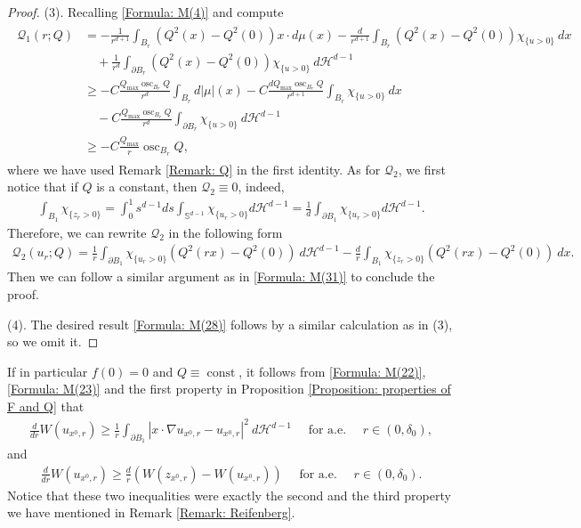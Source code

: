 \documentclass[11pt,reqno]{amsart}
\begin{document}
\begin{proof}
    (3). Recalling \eqref{Formula: M(4)} and compute 
    \begin{align}\label{Formula: M(31)}
    	\begin{alignedat}{5}
    		\mathcal{Q}_{1}(r;Q)&=-\frac{1}{r^{d+1}}\int_{B_{r}}(Q^{2}(x)-Q^{2}(0))x\cdot d\mu(x)-\frac{d}{r^{d+1}}\int_{B_{r}}(Q^{2}(x)-Q^{2}(0))\chi_{\{u>0\}}\:dx\\
    		&\quad+\frac{1}{r^{d}}\int_{\partial B_{r}}(Q^{2}(x)-Q^{2}(0))\chi_{\{u>0\}}\:d\mathcal{H}^{d-1}\\
    		&\geqslant-C\frac{Q_{\mathrm{max}}\operatorname{osc}_{B_{r}}Q}{r^{d}}\int_{B_{r}}d|\mu|(x)-C\frac{dQ_{\mathrm{max}}\operatorname{osc}_{B_{r}}Q}{r^{d+1}}\int_{B_{r}}\chi_{\{u>0\}}\:dx\\
    		&\quad-C\frac{Q_{\mathrm{max}}\operatorname{osc}_{B_{r}}Q}{r^{d}}\int_{\partial B_{r}}\chi_{\{u>0\}}\:d\mathcal{H}^{d-1}\\
    		&\geqslant-C\frac{Q_{\mathrm{max}}}{r}\operatorname{osc}_{B_{r}}Q,
    	\end{alignedat}
    \end{align}
    where we have used Remark \ref{Remark: Q} in the first identity. As for $\mathcal{Q}_{2}$, we first notice that if $Q$ is a constant, then $\mathcal{Q}_{2}\equiv0$, indeed,
    \begin{align*}
    	\int_{B_{1}}\chi_{\{ z_{r}>0\}}=\int_{0}^{1}s^{d-1}ds\int_{\mathbb{S}^{d-1}}\chi_{\{ u_{r}>0\}}d\mathcal{H}^{d-1}=\frac{1}{d}\int_{\partial B_{1}}\chi_{\{ u_{r}>0\}}d\mathcal{H}^{d-1}.
    \end{align*}
    Therefore, we can rewrite $\mathcal{Q}_{2}$ in the following form
    \begin{align*}
    	\mathcal{Q}_{2}(u_{r};Q)=\frac{1}{r}\int_{\partial B_{1}}\chi_{\{ u_{r}>0\}}(Q^{2}(rx)-Q^{2}(0))\:d\mathcal{H}^{d-1}-\frac{d}{r}\int_{B_{1}}\chi_{\{ z_{r}>0\}}(Q^{2}(rx)-Q^{2}(0))\:dx.
    \end{align*}
    Then we can follow a similar argument as in \eqref{Formula: M(31)} to conclude the proof.
    
    (4). The desired result \eqref{Formula: M(28)} follows by a similar calculation as in (3), so we omit it.
\end{proof}
\begin{remark}\label{Remark: (2) and (3)}
	If in particular $f(0)=0$ and $Q\equiv\operatorname{const}$, it follows from \eqref{Formula: M(22)}, \eqref{Formula: M(23)} and the first property in Proposition \ref{Proposition: properties of F and Q} that 
	\begin{align*}
		\frac{d}{dr}W(u_{x^{0},r})\geqslant\frac{1}{r}\int_{\partial B_{1}}|x\cdot\nabla u_{x^{0},r}-u_{x^{0},r}|^{2}\:d\mathcal{H}^{d-1}\quad\text{ for a.e. }\quad r\in(0,\delta_{0}),
	\end{align*}
	and
	\begin{align*}
		\frac{d}{dr}W(u_{x^{0},r})\geqslant\frac{d}{r}(W(z_{x^{0},r})-W(u_{x^{0},r}))\quad\text{ for a.e. }\quad r\in(0,\delta_{0}).
	\end{align*}
	Notice that these two inequalities were exactly the second and the third property we have mentioned in Remark \ref{Remark: Reifenberg}. 
\end{remark}
\end{document}
